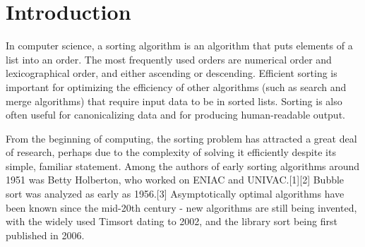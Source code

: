 \section{Introduction}
In computer science, a sorting algorithm is an algorithm that puts elements of a list into an order. The most frequently used orders are numerical order and lexicographical order, and either ascending or descending. Efficient sorting is important for optimizing the efficiency of other algorithms (such as search and merge algorithms) that require input data to be in sorted lists. Sorting is also often useful for canonicalizing data and for producing human-readable output.

From the beginning of computing, the sorting problem has attracted a great deal of research, perhaps due to the complexity of solving it efficiently despite its simple, familiar statement. Among the authors of early sorting algorithms around 1951 was Betty Holberton, who worked on ENIAC and UNIVAC.[1][2] Bubble sort was analyzed as early as 1956.[3] Asymptotically optimal algorithms have been known since the mid-20th century - new algorithms are still being invented, with the widely used Timsort dating to 2002, and the library sort being first published in 2006.
